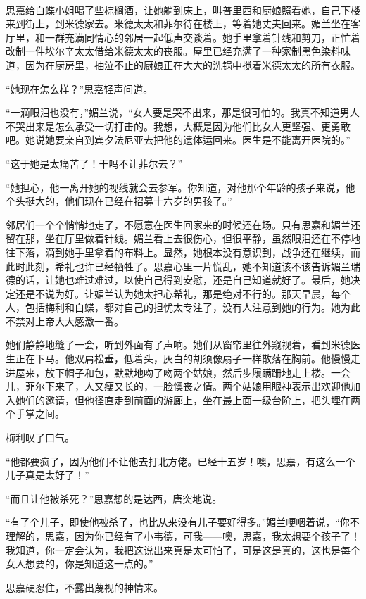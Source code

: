 \par  
\par 思嘉给白蝶小姐喝了些棕榈酒，让她躺到床上，叫普里西和厨娘照看她，自己下楼来到街上，到米德家去。米德太太和菲尔待在楼上，等着她丈夫回来。媚兰坐在客厅里，和一群充满同情心的邻居一起低声交谈着。她手里拿着针线和剪刀，正忙着改制一件埃尔辛太太借给米德太太的丧服。屋里已经充满了一种家制黑色染料味道，因为在厨房里，抽泣不止的厨娘正在大大的洗锅中搅着米德太太的所有衣服。
\par “她现在怎么样？”思嘉轻声问道。
\par “一滴眼泪也没有，”媚兰说，“女人要是哭不出来，那是很可怕的。我真不知道男人不哭出来是怎么承受一切打击的。我想，大概是因为他们比女人更坚强、更勇敢吧。她说她要亲自到宾夕法尼亚去把他的遗体运回来。医生是不能离开医院的。”
\par “这于她是太痛苦了！干吗不让菲尔去？”
\par “她担心，他一离开她的视线就会去参军。你知道，对他那个年龄的孩子来说，他个头挺大的，他们现在已经在招募十六岁的男孩了。”
\par 邻居们一个个悄悄地走了，不愿意在医生回家来的时候还在场。只有思嘉和媚兰还留在那，坐在厅里做着针线。媚兰看上去很伤心，但很平静，虽然眼泪还在不停地往下落，滴到她手里拿着的布料上。显然，她根本没有意识到，战争还在继续，而此时此刻，希礼也许已经牺牲了。思嘉心里一片慌乱，她不知道该不该告诉媚兰瑞德的话，让她也难过难过，以使自己得到安慰，还是自己知道就好了。最后，她决定还是不说为好。让媚兰认为她太担心希礼，那是绝对不行的。那天早晨，每个人，包括梅利和白蝶，都对自己的担忧太专注了，没有人注意到她的行为。她为此不禁对上帝大大感激一番。
\par 她们静静地缝了一会，听到外面有了声响。她们从窗帘里往外窥视着，看到米德医生正在下马。他双肩松垂，低着头，灰白的胡须像扇子一样散落在胸前。他慢慢走进屋来，放下帽子和包，默默地吻了吻两个姑娘，然后步履蹒跚地走上楼。一会儿，菲尔下来了，人又瘦又长的，一脸懊丧之情。两个姑娘用眼神表示出欢迎他加入她们的邀请，但他径直走到前面的游廊上，坐在最上面一级台阶上，把头埋在两个手掌之间。
\par 梅利叹了口气。
\par “他都要疯了，因为他们不让他去打北方佬。已经十五岁！噢，思嘉，有这么一个儿子真是太好了！”
\par “而且让他被杀死？”思嘉想的是达西，唐突地说。
\par “有了个儿子，即使他被杀了，也比从来没有儿子要好得多。”媚兰哽咽着说，“你不理解的，思嘉，因为你已经有了小韦德，可我——噢，思嘉，我太想要个孩子了！我知道，你一定会认为，我把这说出来真是太可怕了，可是这是真的，这也是每个女人想要的，你是知道这一点的。”
\par 思嘉硬忍住，不露出蔑视的神情来。
